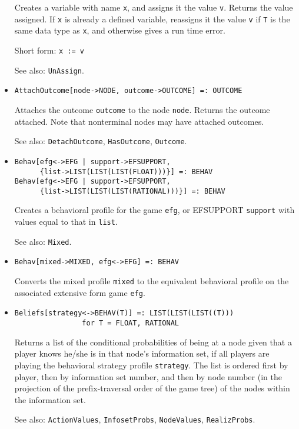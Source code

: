 \begin{itemize}
\bd Creates a variable with name \verb+x+, and assigns it the value
\verb+v+.  Returns the value assigned.  If \verb+x+ is already a
defined variable, reassigns it the value \verb+v+ if \verb+T+ is the
same data type as \verb+x+, and otherwise gives a run time error.
\item
[Short form:] \verb+x := v+
\item
[See also:] {\tt UnAssign}.
\ed

\item
\protect \large \begin{verbatim} 
AttachOutcome[node->NODE, outcome->OUTCOME] =: OUTCOME
\end{verbatim}\normalsize

\bd
Attaches the outcome \verb+outcome+ to the node \verb+node+.
Returns the outcome attached.  Note that nonterminal nodes may have
attached outcomes.
\item
[See also:] {\tt DetachOutcome}, {\tt HasOutcome}, {\tt Outcome}.
\ed



\item
\protect \large \begin{verbatim}
Behav[efg<->EFG | support->EFSUPPORT, 
      {list->LIST(LIST(LIST(FLOAT)))}] =: BEHAV
Behav[efg<->EFG | support->EFSUPPORT, 
      {list->LIST(LIST(LIST(RATIONAL)))}] =: BEHAV
\end{verbatim}\normalsize

\bd Creates a behavioral profile for the game \verb+efg+, or EFSUPPORT
\verb+support+ with values equal to that in \verb+list+.
\item
[See also:] {\tt Mixed}.
\ed

\item
\protect \large \begin{verbatim}
Behav[mixed->MIXED, efg<->EFG] =: BEHAV
\end{verbatim}\normalsize

\bd
Converts the mixed profile \verb+mixed+ to the equivalent
behavioral profile on the associated extensive form game \verb+efg+.
\ed

\item
\protect \large \begin{verbatim}
Beliefs[strategy<->BEHAV(T)] =: LIST(LIST(LIST((T)))
                for T = FLOAT, RATIONAL
\end{verbatim}\normalsize

\bd 
Returns a list of the conditional probabilities of being at a node
given that a player knows he/she is in that node's information set, if
all players are playing the behavioral strategy profile
\verb+strategy+.  The list is ordered first by player, then
by information set number, and then by node number (in the projection
of the prefix-traversal order of the game tree) of the nodes within
the information set.  
\item
[See also:] {\tt ActionValues}, {\tt InfosetProbs},
{\tt NodeValues}, {\tt RealizProbs}.
\ed



\end{itemize}
